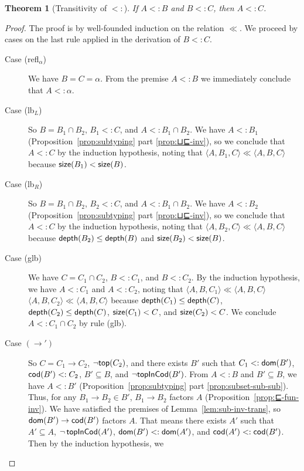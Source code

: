 \documentclass{article}
\newtheorem{theorem}{Theorem}
\begin{document}
\begin{theorem}[Transitivity of $<:$]\label{thm:⊑-trans}
    If $A <: B$ and $B <: C$, then $A <: C$.
\end{theorem}
\begin{proof}
  The proof is by well-founded induction on the relation $\ll$.
  We proceed by cases on the last rule applied in the
  derivation of $B <: C$.
  \begin{description}
  \item[Case (refl$_\alpha$)] We have $B = C = \alpha$.  From the premise $A <:
    B$ we immediately conclude that $A <: \alpha$.
  \item[Case (lb$_L$)] So $B = B_1 \cap B_2$, $B_1 <: C$, and $A <: B_1 \cap
    B_2$.  We have $A <: B_1$ (Proposition~\ref{prop:subtyping} part
    \ref{prop:⊔⊑-inv}), so we conclude that $A <: C$ by the induction
    hypothesis, noting that $\langle A, B_1, C \rangle \ll \langle A,
    B, C \rangle$ because $\mathsf{size}(B_1) < \mathsf{size}(B)$.
  \item[Case (lb$_R$)] So $B = B_1 \cap B_2$, $B_2 <: C$, and $A <: B_1 \cap
    B_2$.  We have $A <: B_2$ (Proposition~\ref{prop:subtyping} part
    \ref{prop:⊔⊑-inv}), so we conclude that $A <: C$ by the induction
    hypothesis, noting that $\langle A, B_2, C \rangle \ll \langle A,
    B, C \rangle$ because $\mathsf{depth}(B_2) \leq \mathsf{depth}(B)$ and $\mathsf{size}(B_2)
    < \mathsf{size}(B)$.
  \item[Case (glb)] We have $C = C_1 \cap C_2$, $B <: C_1$, and $B <:
    C_2$.  By the induction hypothesis, we have $A <: C_1$ and $A <:
    C_2$, noting that $\langle A, B, C_1 \rangle \ll \langle A, B, C
    \rangle$ $\langle A, B, C_2 \rangle \ll \langle A, B, C\rangle$
    because $\mathsf{depth}(C_1) \leq \mathsf{depth}(C)$, $\mathsf{depth}(C_2) \leq
    \mathsf{depth}(C)$, $\mathsf{size}(C_1) < C$, and $\mathsf{size}(C_2) < C$.
    We conclude $A <: C_1 \cap C_2$ by rule (glb).
  \item[Case $(\to')$] So $C = C_1 \to C_2$, $\neg \mathsf{top}(C_2)$, and
    there exists $B'$ such that $C_1 <: \mathsf{dom}(B')$, $\mathsf{cod}(B') <: C_2$,
    $B' \subseteq B$, and $\neg \mathsf{topInCod}(B')$. From $A <: B$ and $B' \subseteq B$, we
    have $A <: B'$ (Proposition~\ref{prop:subtyping} part
    \ref{prop:subset-sub-sub}). Thus, for any $B_1 \to B_2 \in B'$,
    $B_1 \to B_2$ factors $A$ (Proposition~\ref{prop:⊑-fun-inv}). We
    have satisfied the premises of Lemma~\ref{lem:sub-inv-trans}, so
    $\mathsf{dom}(B') \to \mathsf{cod}(B')$ factors $A$. That means there exists $A'$
    such that $A' \subseteq A$, $\neg\,\mathsf{topInCod}(A')$, $\mathsf{dom}(B') <: \mathsf{dom}(A')$,
    and $\mathsf{cod}(A') <: \mathsf{cod}(B')$. Then by the induction hypothesis, we

\end{description}
\end{proof}
\end{document}
